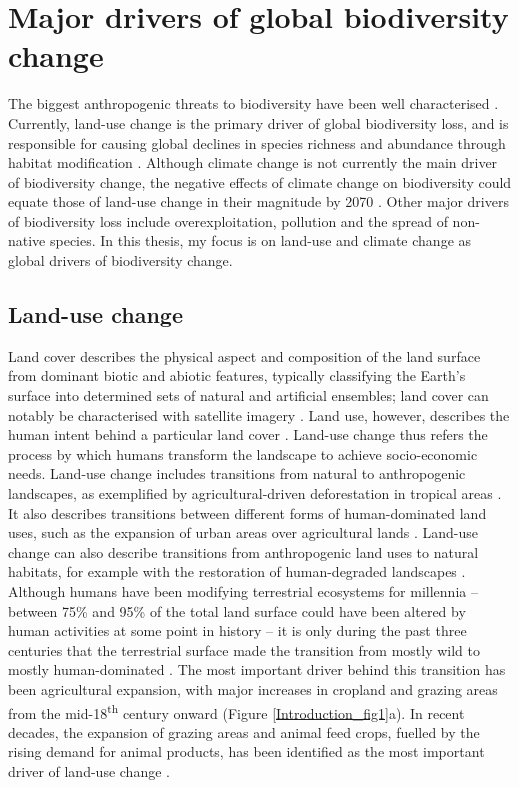 \section{Major drivers of global biodiversity change}

The biggest anthropogenic threats to biodiversity have been well characterised \citep{Maxwell2016}. Currently, land-use change is the primary driver of global biodiversity loss, and is responsible for causing global declines in species richness and abundance through habitat modification \citep{Newbold2015, Chaudhary2018a, Nowakowski2018a, Powers2019}. Although climate change is not currently the main driver of biodiversity change, the negative effects of climate change on biodiversity could equate those of land-use change in their magnitude by 2070 \citep{Newbold2018}. Other major drivers of biodiversity loss include overexploitation, pollution and the spread of non-native species. In this thesis, my focus is on land-use and climate change as global drivers of biodiversity change.

\subsection{Land-use change}

Land cover describes the physical aspect and composition of the land surface from dominant biotic and abiotic features, typically classifying the Earth’s surface into determined sets of natural and artificial ensembles; land cover can notably be characterised with satellite imagery \citep{Wulder2018}. Land use, however, describes the human intent behind a particular land cover \citep{Lambin2001}. Land-use change thus refers the process by which humans transform the landscape to achieve socio-economic needs. Land-use change includes transitions from natural to anthropogenic landscapes, as exemplified by agricultural-driven deforestation in tropical areas \citep{Jayathilake2021}. It also describes transitions between different forms of human-dominated land uses, such as the expansion of urban areas over agricultural lands \citep{Ustaoglu2017}. Land-use change can also describe transitions from anthropogenic land uses to natural habitats, for example with the restoration of human-degraded landscapes \citep{BanksLeite2020}. Although humans have been modifying terrestrial ecosystems for millennia – between 75\% and 95\% of the total land surface could have been altered by human activities at some point in history  \citep{Ellis2013, Ellis2021} – it is only during the past three centuries that the terrestrial surface made the transition from mostly wild to mostly human-dominated \citep{Ellis2010}. The most important driver behind this transition has been agricultural expansion, with major increases in cropland and grazing areas from the mid-18\textsuperscript{th} century onward (Figure \ref{Introduction_fig1}a). In recent decades, the expansion of grazing areas and animal feed crops, fuelled by the rising demand for animal products, has been identified as the most important driver of land-use change \citep{Alexander2015}. 

